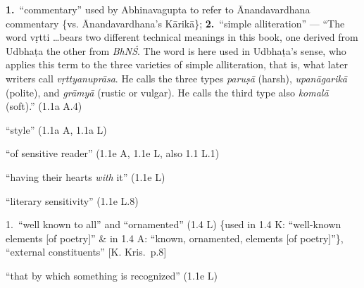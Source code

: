 \documentclass[10pt]{article}
\begin{document}
\begin{multicols}{2}
\begin{enumerate}[
			leftmargin=0em,
			rightmargin=0em,
		]
		 \textbf{1.}\ ``commentary'' used by Abhinavagupta to refer to Ānandavardhana commentary \{vs. Ānanda\-var\-dhana's Kārikā\};
		\textbf{2.}\ ``simple alliteration'' ---
		``The word vṛtti \dots bears two different technical meanings in this book, one derived from Udbhaṭa the other from \textit{BhNŚ}. The word is here used in Udbhaṭa's sense, who applies this term to the three varieties of simple alliteration, that is, what later writers call \textit{vṛttyanuprāsa}. He calls the three types \textit{paruṣā} (harsh), \textit{upanāgarikā} (polite), and \textit{grāmyā} (rustic or vulgar). He calls the third type also \textit{komalā} (soft).'' (1.1a A.4)

		 ``style'' (1.1a A, 1.1a L)

		 ``of sensitive reader'' (1.1e A, 1.1e L, also 1.1 L.1)

		 ``having their hearts \textit{with} it'' (1.1e L)

		 ``literary sensitivity'' (1.1e L.8)


		 1.\ ``well known to all'' and ``ornamented'' (1.4 L) \{used in 1.4 K: ``well-known elements [of poetry]'' \& in 1.4 A: ``known, ornamented, elements [of poetry]''\},
		``external constituents'' [K. Kris.\ p.8]

		 ``that by which something is recognized'' (1.1e L)


\end{enumerate}
\end{multicols}
\end{document}
